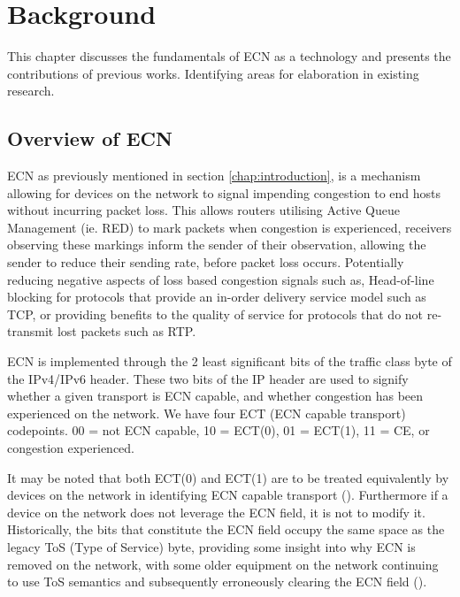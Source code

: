 \documentclass{l4proj}
\begin{document}
\clearpage


\chapter{Background}

This chapter discusses the fundamentals of ECN as a technology and presents the contributions of previous works. Identifying areas for elaboration in existing research.

\section{Overview of ECN}

ECN as previously mentioned in section \ref{chap:introduction}, is a mechanism allowing for devices on the network to signal impending congestion to end hosts without incurring packet loss. This allows routers utilising Active Queue Management (ie. RED) to mark packets when congestion is experienced, receivers observing these markings inform the sender of their observation, allowing the sender to reduce their sending rate, before packet loss occurs. Potentially reducing negative aspects of loss based congestion signals such as, Head-of-line blocking for protocols that provide an in-order delivery service model such as TCP, or providing benefits to the quality of service for protocols that do not re-transmit lost packets such as RTP.

ECN is implemented through the 2 least significant bits of the traffic class byte of the IPv4/IPv6 header. These two bits of the IP header are used to signify whether a given transport is ECN capable, and whether congestion has been experienced on the network. We have four ECT (ECN capable transport) codepoints. 00 = not ECN capable, 10 = ECT(0), 01 = ECT(1), 11 = CE, or congestion experienced. 

It may be noted that both ECT(0) and ECT(1) are to be treated equivalently by devices on the network in identifying ECN capable transport (\cite{floyd_addition_2001}). Furthermore if a device on the network does not leverage the ECN field, it is not to modify it. Historically, the bits that constitute the ECN field occupy the same space as the legacy ToS (Type of Service) byte, providing some insight into why ECN is removed on the network, with some older equipment on the network continuing to use ToS semantics and subsequently erroneously clearing the ECN field (\cite{kuhlewind_state_2013}).
\end{document}
